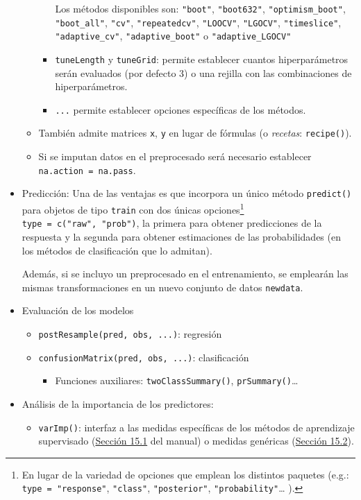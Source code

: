 \documentclass[
]{book}
\providecommand{\tightlist}{%
  \setlength{\itemsep}{0pt}\setlength{\parskip}{0pt}}
\theoremstyle{break}
\theoremstyle{nonumberplain}
\begin{document}
\begin{itemize}
\begin{itemize}
\begin{itemize}
      Los métodos disponibles son: \texttt{"boot"}, \texttt{"boot632"}, \texttt{"optimism\_boot"}, \texttt{"boot\_all"}, \texttt{"cv"}, \texttt{"repeatedcv"}, \texttt{"LOOCV"}, \texttt{"LGOCV"}, \texttt{"timeslice"}, \texttt{"adaptive\_cv"}, \texttt{"adaptive\_boot"} o \texttt{"adaptive\_LGOCV"}
    \item
      \texttt{tuneLength} y \texttt{tuneGrid}: permite establecer cuantos hiperparámetros serán evaluados (por defecto 3) o una rejilla con las combinaciones de hiperparámetros.
    \item
      \texttt{...} permite establecer opciones específicas de los métodos.
    \end{itemize}
  \item
    También admite matrices \texttt{x}, \texttt{y} en lugar de fórmulas (o \emph{recetas}: \texttt{recipe()}).
  \item
    Si se imputan datos en el preprocesado será necesario establecer \texttt{na.action\ =\ na.pass}.
  \end{itemize}
\item
  Predicción: Una de las ventajas es que incorpora un único método \texttt{predict()} para objetos de tipo \texttt{train} con dos únicas opciones\footnote{En lugar de la variedad de opciones que emplean los distintos paquetes (e.g.: \texttt{type\ =\ "response"}, \texttt{"class"}, \texttt{"posterior"}, \texttt{"probability"}\ldots{} ).} \texttt{type\ =\ c("raw",\ "prob")}, la primera para obtener predicciones de la respuesta y la segunda para obtener estimaciones de las probabilidades (en los métodos de clasificación que lo admitan).

  Además, si se incluyo un preprocesado en el entrenamiento, se emplearán las mismas transformaciones en un nuevo conjunto de datos \texttt{newdata}.
\item
  Evaluación de los modelos

  \begin{itemize}
  \item
    \texttt{postResample(pred,\ obs,\ ...)}: regresión
  \item
    \texttt{confusionMatrix(pred,\ obs,\ ...)}: clasificación

    \begin{itemize}
    \tightlist
    \item
      Funciones auxiliares: \texttt{twoClassSummary()}, \texttt{prSummary()}\ldots{}
    \end{itemize}
  \end{itemize}
\item
  Análisis de la importancia de los predictores:

  \begin{itemize}
  \tightlist
  \item
    \texttt{varImp()}: interfaz a las medidas específicas de los métodos de aprendizaje supervisado (\href{https://topepo.github.io/caret/variable-importance.html\#model-specific-metrics}{Sección 15.1} del manual) o medidas genéricas (\href{https://topepo.github.io/caret/variable-importance.html\#model-independent-metrics}{Sección 15.2}).
  \end{itemize}
\end{itemize}
\end{document}
